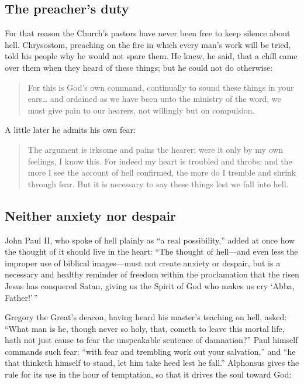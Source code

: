 \subsection{The preacher's duty}

For that reason the Church's pastors have never been free to keep silence about hell. Chrysostom, preaching on the fire in which every man's work will be tried, told his people why he would not spare them. He knew, he said, that a chill came over them when they heard of these things; but he could not do otherwise:

\begin{quote}
For this is God's own command, continually to sound these things in your ears\ldots{} and ordained as we have been unto the ministry of the word, we must give pain to our hearers, not willingly but on compulsion.
\end{quote}

\noindent A little later he admits his own fear:

\begin{quote}
The argument is irksome and pains the hearer: were it only by my own feelings, I know this. For indeed my heart is troubled and throbs; and the more I see the account of hell confirmed, the more do I tremble and shrink through fear. But it is necessary to say these things lest we fall into hell.
\end{quote}

\subsection{Neither anxiety nor despair}

John Paul II, who spoke of hell plainly as ``a real possibility,'' added at once how the thought of it should live in the heart: ``The thought of hell---and even less the improper use of biblical images---must not create anxiety or despair, but is a necessary and healthy reminder of freedom within the proclamation that the risen Jesus has conquered Satan, giving us the Spirit of God who makes us cry `Abba, Father!'\,''

Gregory the Great's deacon, having heard his master's teaching on hell, asked: ``What man is he, though never so holy, that, cometh to leave this mortal life, hath not just cause to fear the unspeakable sentence of damnation?'' Paul himself commands such fear: ``with fear and trembling work out your salvation,'' and ``he that thinketh himself to stand, let him take heed lest he fall.'' Alphonsus gives the rule for its use in the hour of temptation, so that it drives the soul toward God:

